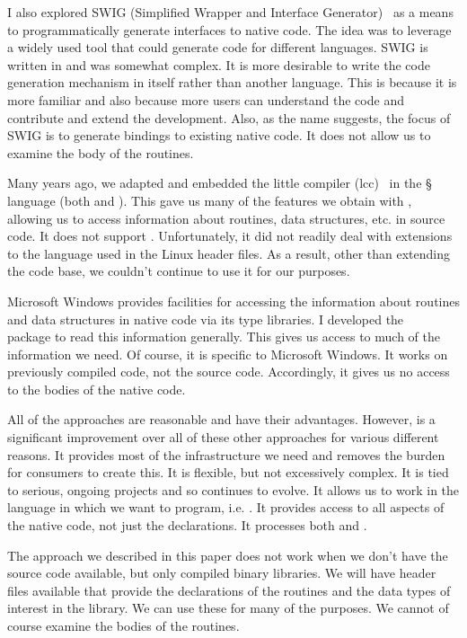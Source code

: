 I also explored SWIG (Simplified Wrapper and Interface
Generator)~\cite{bib:SWIG} as a means to programmatically generate
interfaces to native code. The idea was to leverage a widely used tool
that could generate code for different languages.  SWIG is written in
\perl{} and was somewhat complex. It is more desirable to write the
code generation mechanism in \R{} itself rather than another language.
This is because it is more familiar and also because more users can
understand the code and contribute and extend the development.  Also,
as the name suggests, the focus of SWIG is to generate bindings to
existing native code.  It does not allow us to examine the body of the
routines.


Many years ago, we adapted and embedded the little \C{} compiler
(lcc)~\cite{bib:lcc} in the \S{} language (both \R{} and \Splus).  This gave us many of the
features we obtain with \libclang, allowing us to access information
about routines, data structures, etc. in source code.  It does not
support \Cpp. Unfortunately, it did not readily deal with extensions
to the \C{} language used in the Linux header files. As a result,
other than extending the code base, we couldn't continue to use it for
our purposes.
 
Microsoft Windows provides facilities for accessing the information
about routines and data structures in native code via its type
libraries.  I developed the
~\cite{bib:SWinTypeLibs} package to read this
information generally. This gives us access to much of the information
we need. Of course, it is specific to Microsoft Windows. It works on
previously compiled code, not the source code.  Accordingly, it gives
us no access to the bodies of the native code.



All of the approaches are reasonable and have their
advantages. However, \libclang{} is a significant improvement over all
of these other approaches for various different reasons. It provides
most of the infrastructure we need and removes the burden for
consumers to create this.  It is flexible, but not excessively complex.
It is tied to serious, ongoing projects and so continues to evolve. It
allows us to work in the language in which we want to program,
i.e. \R.  It provides access to all aspects of the native code, not
just the declarations. It processes both \C{} and \Cpp.

The approach we described in this paper does not work when we don't
have the source code available, but only compiled binary libraries. We
will have header files available that provide the declarations of the
routines and the data types of interest in the library.  We can use
these for many of the purposes. We cannot of course examine the bodies
of the routines.

